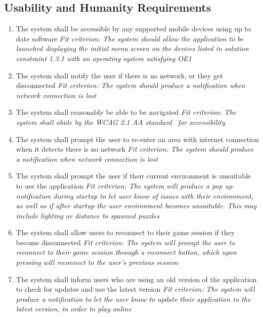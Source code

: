 \documentclass[12pt]{article}
\begin{document}
\subsection{Usability and Humanity Requirements}
\begin{enumerate}[UH\arabic*.]
	\item The system shall be accessible by any supported mobile devices using up to date software\newline
    \textit{Fit criterion: The system should allow the application to be launched displaying the initial menu screen on the devices listed in solution constraint 1.3.1 with an operating system satisfying OE1}
    \item The system shall notify the user if there is no network, or they get disconnected\newline
    \textit{Fit criterion: The system should produce a notification when network connection is lost}
    \item The system shall reasonably be able to be navigated\newline
    \textit{Fit criterion: The system shall abide by the WCAG 2.1 AA standard~\citep{WCAG2.1}  for accessibility}
    \item The system shall prompt the user to re-enter an area with internet connection when it detects there is no network\newline
    \textit{Fit criterion: The system should produce a notification when network connection is lost}
    \item The system shall prompt the user if their current environment is unsuitable to use the application\newline
    \textit{Fit criterion: The system will produce a pop up notification during startup to let user know of issues with their environment, as well as if after startup the user environment becomes unsuitable. This may include lighting or distance to spawned puzzles}
    \item The system shall allow users to reconnect to their game session if they become disconnected\newline
    \textit{Fit criterion: The system will prompt the user to reconnect to their game session through a reconnect button, which upon pressing will reconnect to the user's previous session}
    \item The system shall inform users who are using an old version of the application to check for updates and use the latest version
    \newline
    \textit{Fit criterion: The system will produce a notification to let the user know to update their application to the latest version, in order to play online}
    
\end{enumerate}
\end{document}
